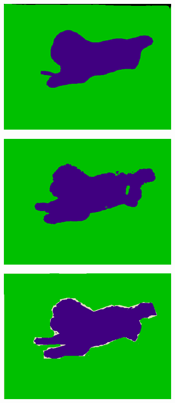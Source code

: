 \documentclass{article} %
\begin{document}
\begin{figure}[t]
\begin{subfigure}[b]{0.19\linewidth}
    \includegraphics[width=\textwidth]{figs/ab/context/2007_008260}
  \end{subfigure}
  \begin{subfigure}[b]{0.19\linewidth}
    \includegraphics[width=\textwidth]{figs/ab/crf/2007_008260}
  \end{subfigure}
  \begin{subfigure}[b]{0.19\linewidth}
    \includegraphics[width=\textwidth]{figs/ab/gt/2007_008260}

\end{subfigure}
\end{figure}
\end{document}
